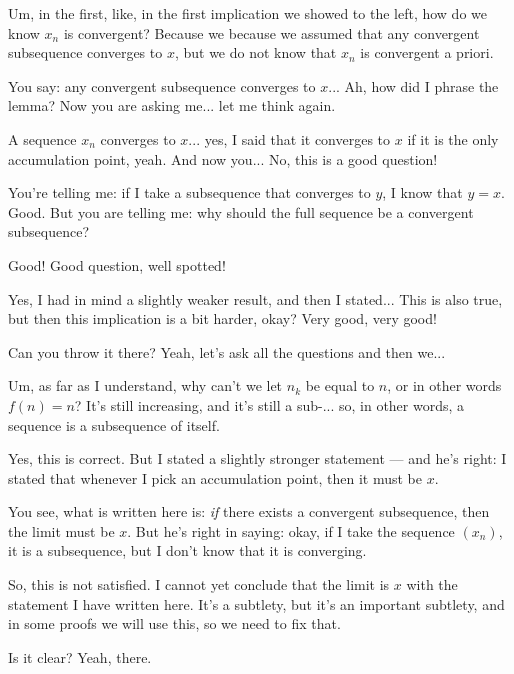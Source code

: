 \begin{student}
Um, in the first, like, in the first implication we showed to the left, how do we know $x_n$ is convergent? Because we because we assumed that any convergent subsequence converges to $x$, but we do not know that $x_n$ is convergent a priori.
\end{student}

\begin{speech}[00:35:56 - 00:37:10]
You say: any convergent subsequence converges to $x$... Ah, how did I phrase the lemma? Now you are asking me... let me think again.

A sequence $x_n$ converges to $x$... yes, I said that it converges to $x$ if it is the only accumulation point, yeah. And now you... No, this is a good question!

You're telling me: if I take a subsequence that converges to $y$, I know that $y = x$. Good. But you are telling me: why should the full sequence be a convergent subsequence?


Good! Good question, well spotted!

Yes, I had in mind a slightly weaker result, and then I stated... This is also true, but then this implication is a bit harder, okay? Very good, very good!
\end{speech}

\begin{speech}[00:37:13 - 00:37:22]
Can you throw it there? Yeah, let's ask all the questions and then we...
\end{speech}

\begin{student}
Um, as far as I understand, why can't we let $n_k$ be equal to $n$, or in other words $f(n) = n$? It's still increasing, and it's still a sub-... so, in other words, a sequence is a subsequence of itself.
\end{student}

\begin{speech}[00:37:41 - 00:38:50]
Yes, this is correct. But I stated a slightly stronger statement --- and he's right: I stated that whenever I pick an accumulation point, then it must be $x$.

You see, what is written here is: \emph{if} there exists a convergent subsequence, then the limit must be $x$. But he's right in saying: okay, if I take the sequence $(x_n)$, it is a subsequence, but I don't know that it is converging.

So, this  is not satisfied. I cannot yet conclude that the limit is $x$ with the statement I have written here. It's a subtlety, but it's an important subtlety, and in some proofs we will use this, so we need to fix that.

Is it clear? Yeah, there.
\end{speech}

